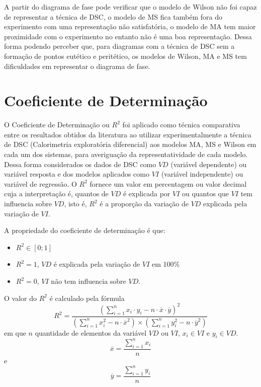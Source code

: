 A partir do diagrama de fase pode verificar que o modelo de Wilson não foi capaz de representar a técnica de DSC, o modelo de MS fica também fora do experimento com uma representação não satisfatória, o modelo de MA tem maior proximidade com o experimento no entanto não é uma boa representação. Dessa forma podendo perceber que, para diagramas com a técnica de DSC sem a formação de pontos eutético e peritético, os modelos de Wilson, MA e MS tem dificuldades em representar o diagrama de fase.

\section{Coeficiente de Determinação}

O Coeficiente de Determinação ou $R^2$ foi aplicado como técnica comparativa entre os resultados obtidos da literatura ao utilizar experimentalmente a técnica de DSC (Calorimetria exploratória diferencial) aos modelos MA, MS e Wilson em cada um dos sistemas, para averiguação da representatividade de cada modelo. Dessa forma considerados os dados de DSC como $VD$ (variável dependente) ou variável resposta e dos modelos aplicados como $VI$ (variável independente) ou variável de regressão. O $R^2$ fornece um valor em percentagem ou valor decimal cuja a interpretação é, quantos de $VD$ é explicada por $VI$ ou quantos que $VI$ tem influencia sobre $VD$, isto é, $R^2$ é a proporção da variação de $VD$ explicada pela variação de $VI$. 

A propriedade do coeficiente de determinação é que:
\begin{itemize}
    \item $R^2\in [0;1]$
    \item $R^2=1$, $VD$ é explicada pela variação de $VI$ em 100\%
    \item $R^2=0$, $VI$ não tem influencia sobre $VD$.
\end{itemize}

O valor do $R^2$ é calculado pela fórmula
\begin{equation}
    R^2=\frac{\left(\displaystyle\sum_{i=1}^{n}x_i\cdot y_i-n\cdot\overline{x}\cdot\overline{y}\right)^2}{\left(\displaystyle\sum_{i=1}^{n}x_i^2-n\cdot\overline{x}^2\right)\times\left(\displaystyle\sum_{i=1}^{n}y_i^2-n\cdot\overline{y}^2\right)}
\end{equation}
em que $n$ quantidade de elementos da variável $VD$ ou $VI$, $x_i\in VI$ e $y_i\in VD$.
\begin{equation}
    \overline{x}=\frac{\displaystyle\sum_{i=1}^{n}x_i}{n}
\end{equation}
e
\begin{equation}
    \overline{y}=\frac{\displaystyle\sum_{i=1}^{n}y_i}{n}
\end{equation}

